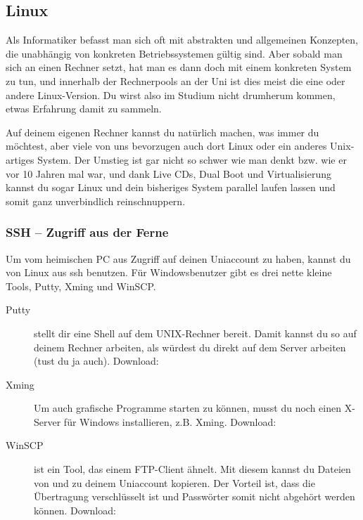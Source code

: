 

\subsection{Linux}
	\label{linux}
	Als Informatiker befasst man sich oft mit abstrakten und allgemeinen Konzepten, die unabhängig von konkreten Betriebssystemen gültig sind. Aber sobald man sich an einen Rechner setzt, hat man es dann doch mit einem konkreten System zu tun, und innerhalb der Rechnerpools an der Uni ist dies meist die eine oder andere Linux-Version. Du wirst also im Studium nicht drumherum kommen, etwas Erfahrung damit zu sammeln.

	Auf deinem eigenen Rechner kannst du natürlich machen, was immer du möchtest, aber viele von uns bevorzugen auch dort Linux oder ein anderes Unix-artiges System. Der Umstieg ist gar nicht so schwer wie man denkt bzw. wie er vor 10 Jahren mal war, und dank Live CDs, Dual Boot und Virtualisierung kannst du sogar Linux und dein bisheriges System parallel laufen lassen und somit ganz unverbindlich reinschnuppern.


	\subsubsection{SSH -- Zugriff aus der Ferne}
		Um vom heimischen PC aus Zugriff auf deinen Uniaccount zu haben, kannst du von Linux aus ssh benutzen. Für Windowsbenutzer gibt es drei nette kleine Tools, Putty, Xming und WinSCP. %

		\begin{description}
			\item[Putty] stellt dir eine Shell auf dem UNIX-Rechner bereit. Damit kannst du so auf deinem Rechner arbeiten, als würdest du direkt
			  auf dem Server arbeiten (tust du ja auch).  Download: 
			\item[Xming] Um auch grafische Programme starten zu können, musst du noch einen X-Server für Windows
			  installieren, z.B. Xming. Download: 
			\item[WinSCP] ist ein Tool, das einem FTP-Client ähnelt. Mit diesem kannst du Dateien von und zu deinem Uniaccount kopieren. Der Vorteil ist, dass die Übertragung verschlüsselt ist und Passwörter somit nicht abgehört werden können. Download: 
		\end{description}

